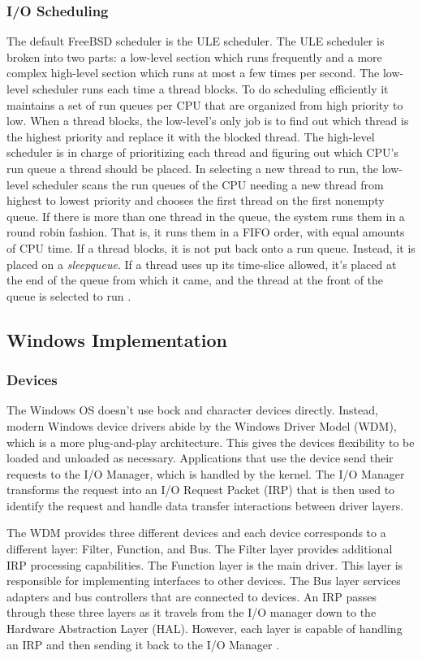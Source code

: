 \documentclass[onecolumn,draftclsnofoot, 10pt, compsoc]{IEEEtran}
\begin{document}
		\subsubsection{I/O Scheduling}
			The default FreeBSD scheduler is the ULE scheduler.
			The ULE scheduler is broken into two parts: a low-level section which runs frequently and a more complex high-level section which runs at most a few times per second.
			The low-level scheduler runs each time a thread blocks.
			To do scheduling efficiently it maintains a set of run queues per CPU that are organized from high priority to low.
			When a thread blocks, the low-level's only job is to find out which thread is the highest priority and replace it with the blocked thread. 
			The high-level scheduler is in charge of prioritizing each thread and figuring out which CPU's run queue a thread should be placed.
			In selecting a new thread to run, the low-level scheduler scans the run queues of the CPU needing a new thread from highest to lowest priority and chooses the first thread on the first nonempty queue.
			If there is more than one thread in the queue, the system runs them in a round robin fashion. 
			That is, it runs them in a FIFO order, with equal amounts of CPU time. 
			If a thread blocks, it is not put back onto a run queue. 
			Instead, it is placed on a \textit{sleepqueue}. 
			If a thread uses up its time-slice allowed, it's placed at the end of the queue from which it came, and the thread at the front of the queue is selected to run \cite{freeBSDScheduler}.
	
	
	\subsection{Windows Implementation}
		\subsubsection{Devices}
			The Windows OS doesn't use bock and character devices directly.
			Instead, modern Windows device drivers abide by the Windows Driver Model (WDM), which is a more plug-and-play architecture.
			This gives the devices flexibility to be loaded and unloaded as necessary. 
			Applications that use the device send their requests to the I/O Manager, which is handled by the kernel.
			The I/O Manager transforms the request into an I/O Request Packet (IRP) that is then used to identify the request and handle data transfer interactions between driver layers.
			
			The WDM provides three different devices and  each device corresponds to a different layer: Filter, Function, and Bus.
			The Filter layer provides additional IRP processing capabilities.
			The Function layer is the main driver. This layer is responsible for implementing interfaces to other devices.
			The Bus layer services adapters and bus controllers that are connected to devices.
			An IRP passes through these three layers as it travels from the I/O manager down to the Hardware Abstraction Layer (HAL).
			However, each layer is capable of handling an IRP and then sending it back to the I/O Manager \cite{windowsDevs}.
	
\end{document}
